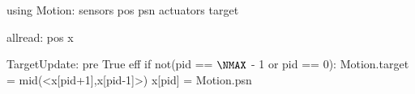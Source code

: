    using Motion:
      sensors pos psn
      actuators target
      
   allread: pos x $\label{lineformp}$
   
   TargetUpdate:
      pre True
      eff if not(pid == $\NMAX$ - 1 or pid == 0):
         Motion.target = mid(<x[pid+1],x[pid-1]>)
         x[pid] = Motion.psn